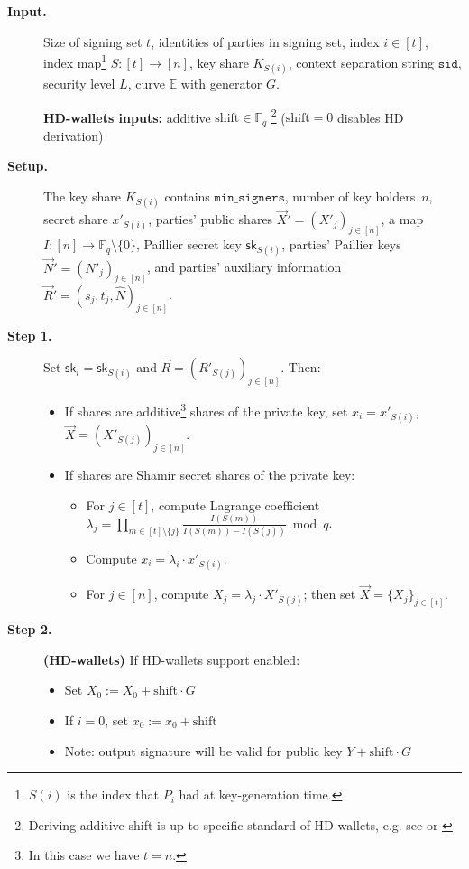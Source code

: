 \documentclass[11pt]{article}
\newcommand{\threshold}{\ensuremath{\mathtt{min\_signers}}}
\newcommand{\sid}{\ensuremath{\mathtt{sid}}}
\newcommand{\sk}{\textsf{sk}}
\newcommand{\Fq}{\mathbb{F}_q}
\newcommand{\E}{\mathbb{E}}
\newcommand{\?}[1]{\stackrel{?}{#1}}
\begin{document}
\begin{description}

\item[\bf Input.] 
  Size of signing set $t$,
  identities of parties in signing set,
  index $i\in [t]$,
  index map\footnote{$S(i)$ is the index that $P_i$ had at key-generation time.} $S : [t] \to [n]$,
  key share $K_{S(i)}$,
  context separation string $\sid$,
  security level $L$, curve $\E$ with generator $G$.

  {\bf HD-wallets inputs:} additive $\text{shift} \in \Fq$ \footnote{Deriving additive shift is up to specific standard of HD-wallets, e.g. see \cite{bip32} or \cite{slip10} \label{deriving-shift-note}} ($\text{shift} = 0$ disables HD derivation)

    \item[\bf Setup.] The key share $K_{S(i)}$ contains $\threshold$, number of key holders~$n$, secret share $x'_{S(i)}$, parties' public shares $\vec X' = (X'_j)_{j \in [n]}$, a map $I : [n] \to \Fq \setminus \{0\}$, Paillier secret key $\sk_{S(i)}$, parties' Paillier keys $\vec N' = (N'_j)_{j \in [n]}$, and parties' auxiliary information $\vec R' = (s_j, t_j, \hat N)_{j \in [n]}$.

    \item[\bf Step 1.] Set $\sk_i = \sk_{S(i)}$ and 
                       $\vec R = (R'_{S(j)})_{j \in [n]}$. Then:
    \begin{itemize}
        \item If shares are additive\footnote{In this case we have $t=n$.} shares of the private key, 
            set $x_{i} = x'_{S(i)}$, $\vec X = (X'_{S(j)})_{j \in [n]}$.
        
        \item If shares are Shamir secret shares of the private key: 
        \begin{itemize}
            \item For $j \in [t]$, compute Lagrange coefficient $\lambda_j = \prod\limits_{m \in [t]\setminus\{j\}} \frac{I(S(m))}{I(S(m)) - I(S(j))} \bmod{q}$.
            \item Compute $x_{i} = \lambda_i \cdot x'_{S(i)}$.
            \item For $j \in [n]$, compute $X_j= \lambda_j \cdot X'_{S(j)}$; then set $\vec X = \{X_j\}_{j \in [t]}$.
        \end{itemize}
    \end{itemize}

    \item[\bf Step 2.] {\bf (HD-wallets)} If HD-wallets support enabled:
    \begin{itemize}
      \item Set $X_0 := X_0 + \text{shift} \cdot G$
      \item If $i = 0$, set $x_0 := x_0 + \text{shift}$
      \item Note: output signature will be valid for public key $Y + \text{shift} \cdot G$
    \end{itemize}


\end{description}
\end{document}
